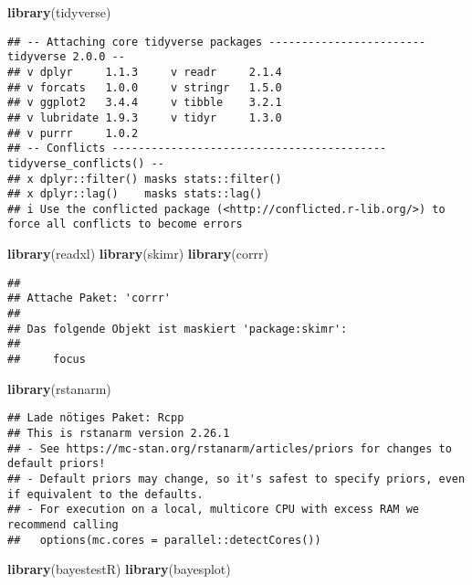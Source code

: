 \documentclass[
]{article}
\author{}
\date{\vspace{-2.5em}}
\newenvironment{Shaded}{\begin{snugshade}}{\end{snugshade}}
\newcommand{\FunctionTok}[1]{\textcolor[rgb]{0.13,0.29,0.53}{\textbf{#1}}}
\newcommand{\NormalTok}[1]{#1}
\begin{document}
\begin{Shaded}
\begin{Highlighting}[]
\FunctionTok{library}\NormalTok{(tidyverse)}
\end{Highlighting}
\end{Shaded}

\begin{verbatim}
## -- Attaching core tidyverse packages ------------------------ tidyverse 2.0.0 --
## v dplyr     1.1.3     v readr     2.1.4
## v forcats   1.0.0     v stringr   1.5.0
## v ggplot2   3.4.4     v tibble    3.2.1
## v lubridate 1.9.3     v tidyr     1.3.0
## v purrr     1.0.2     
## -- Conflicts ------------------------------------------ tidyverse_conflicts() --
## x dplyr::filter() masks stats::filter()
## x dplyr::lag()    masks stats::lag()
## i Use the conflicted package (<http://conflicted.r-lib.org/>) to force all conflicts to become errors
\end{verbatim}

\begin{Shaded}
\begin{Highlighting}[]
\FunctionTok{library}\NormalTok{(readxl)}
\FunctionTok{library}\NormalTok{(skimr)}
\FunctionTok{library}\NormalTok{(corrr)}
\end{Highlighting}
\end{Shaded}

\begin{verbatim}
## 
## Attache Paket: 'corrr'
## 
## Das folgende Objekt ist maskiert 'package:skimr':
## 
##     focus
\end{verbatim}

\begin{Shaded}
\begin{Highlighting}[]
\FunctionTok{library}\NormalTok{(rstanarm)}
\end{Highlighting}
\end{Shaded}

\begin{verbatim}
## Lade nötiges Paket: Rcpp
## This is rstanarm version 2.26.1
## - See https://mc-stan.org/rstanarm/articles/priors for changes to default priors!
## - Default priors may change, so it's safest to specify priors, even if equivalent to the defaults.
## - For execution on a local, multicore CPU with excess RAM we recommend calling
##   options(mc.cores = parallel::detectCores())
\end{verbatim}

\begin{Shaded}
\begin{Highlighting}[]
\FunctionTok{library}\NormalTok{(bayestestR)}
\FunctionTok{library}\NormalTok{(bayesplot)}
\end{Highlighting}
\end{Shaded}
\end{document}

